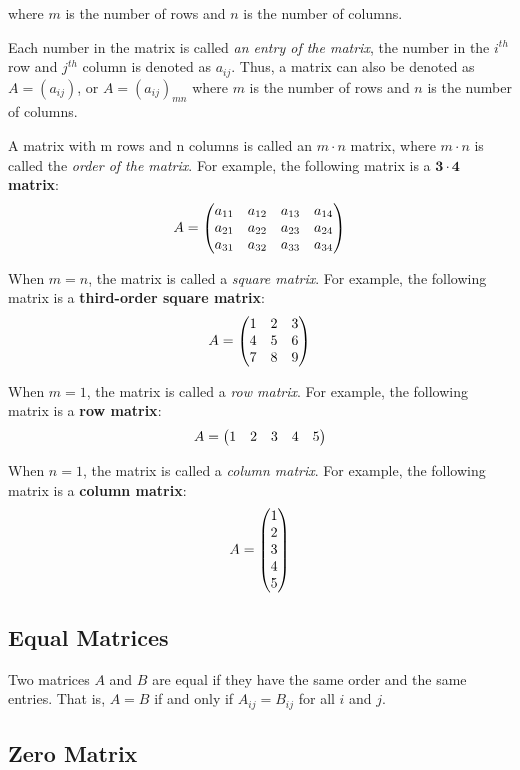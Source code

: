 \documentclass{report}
\begin{document}
\begin{multicols}{2}
  where $m$ is the number of rows and $n$ is the number of columns.

  Each number in the matrix is called \emph{an entry of the matrix}, the number
  in the $i^{th}$ row and $j^{th}$ column is denoted as $a_{ij}$. Thus, a matrix
  can also be denoted as $A = (a_{ij})$, or $A = {(a_{ij})}_{mn}$ where $m$ is
  the number of rows and $n$ is the number of columns.

  A matrix with m rows and n columns is called an $m \cdot n$ matrix, where $m
    \cdot n$ is called the \emph{order of the matrix}. For example, the following
  matrix is a \textbf{$\mathbf{3 \cdot 4}$ matrix}:
  \[
    A = \begin{pmatrix}
      a_{11} & a_{12} & a_{13} & a_{14} \\
      a_{21} & a_{22} & a_{23} & a_{24} \\
      a_{31} & a_{32} & a_{33} & a_{34}
    \end{pmatrix}
  \]

  When $m = n$, the matrix is called a \emph{square matrix}. For example, the
  following matrix is a \textbf{third-order square matrix}:
  \[
    A = \begin{pmatrix}
      1 & 2 & 3 \\
      4 & 5 & 6 \\
      7 & 8 & 9
    \end{pmatrix}
  \]

  When $m = 1$, the matrix is called a \emph{row matrix}. For example, the
  following matrix is a \textbf{row matrix}:
  \[
    A = \begin{pmatrix}
      1 & 2 & 3 & 4 & 5
    \end{pmatrix}
  \]

  When $n = 1$, the matrix is called a \emph{column matrix}. For example, the
  following matrix is a \textbf{column matrix}:
  \[
    A = \begin{pmatrix}
      1 \\
      2 \\
      3 \\
      4 \\
      5
    \end{pmatrix}
  \]

  \singlespacing{}

  \subsection*{Equal Matrices}

  \doublespacing{}

  Two matrices $A$ and $B$ are equal if they have the same order and the same
  entries. That is, $A = B$ if and only if $A_{ij} = B_{ij}$ for all $i$ and $j$.

  \singlespacing{}

  \subsection*{Zero Matrix}


\end{multicols}
\end{document}
